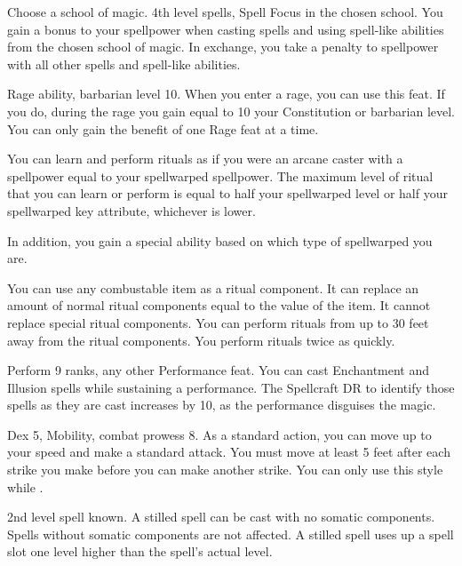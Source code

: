 Choose a school of magic.
\featpres 4th level spells, Spell Focus in the chosen school.
\featben You gain a  bonus to your spellpower when casting spells and using spell-like abilities from the chosen school of magic.
In exchange, you take a  penalty to spellpower with all other spells and spell-like abilities.

\featpres Rage ability, barbarian level 10.
\featben When you enter a rage, you can use this feat. If you do, during the rage you gain  equal to 10 \add your Constitution or barbarian level.
 You can only gain the benefit of one Rage feat at a time.

\featben You can learn and perform rituals as if you were an arcane caster with a spellpower equal to your spellwarped spellpower.
The maximum level of ritual that you can learn or perform is equal to half your spellwarped level or half your spellwarped key attribute, whichever is lower.

In addition, you gain a special ability based on which type of spellwarped you are.

 \x
{}
You can use any combustable item as a ritual component.
It can replace an amount of normal ritual components equal to the value of the item.
It cannot replace special ritual components.
You can perform rituals from up to 30 feet away from the ritual components.
You perform rituals twice as quickly.

\featpres Perform 9 ranks, any other Performance feat.
\featben You can cast Enchantment and Illusion spells while sustaining a performance.
The Spellcraft DR to identify those spells as they are cast increases by 10, as the performance disguises the magic.

\featpres Dex 5, Mobility, combat prowess 8.
\featben As a standard action, you can move up to your speed and make a standard attack.
You must move at least 5 feet after each strike you make before you can make another strike.
You can only use this style while \unencumbered.

\featpre 2nd level spell known.
\featben A stilled spell can be cast with no somatic components.
Spells without somatic components are not affected.
A stilled spell uses up a spell slot one level higher than the spell's actual level.

